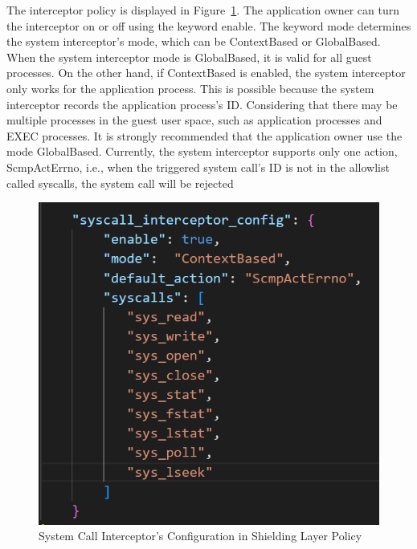 The interceptor policy is displayed in Figure~\ref{fig:policy_system_call}. The application owner can turn the interceptor on or off using the keyword enable. The keyword mode determines the system interceptor's mode, which can be ContextBased or GlobalBased. When the system 
interceptor mode is GlobalBased, it is valid for all guest processes. On the other hand, if ContextBased is enabled, the system interceptor only works for the application process. This is possible because the system interceptor records the 
application process's ID. Considering that there may be multiple processes in the guest user space, such as application processes and EXEC processes. It is strongly recommended that the application owner use the mode GlobalBased. Currently, the 
system interceptor supports only one action, ScmpActErrno, i.e., when the triggered system call's ID is not in the allowlist called syscalls, the system call will be rejected
\begin{figure}[htp]
    \centering
    \includegraphics[scale=0.3]{images/policy_system_call.png}
    \caption[System Call Interceptor's Configuration in Shielding Layer Policy]{System Call Interceptor's Configuration in Shielding Layer Policy}
    \label{fig:policy_system_call}
\end{figure}

